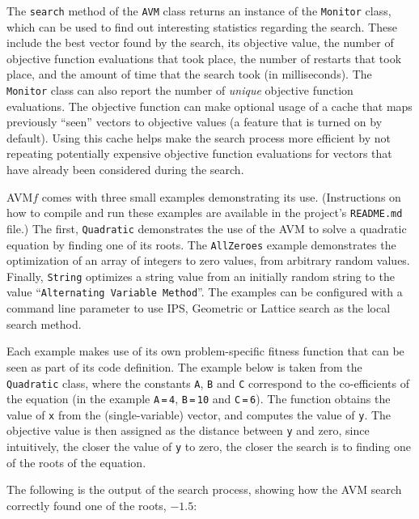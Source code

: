 \documentclass{llncs}
\newcommand{\AVM}{Alternating Variable Method\xspace}
\newcommand{\name}{AVM\hspace{-1pt}$f$\xspace}
\newcommand{\inlineheading}[1]{\vspace{1ex} \noindent {\bf #1.}}
\newcommand{\codescalefactor}{0.7}
\newcommand{\snippet}[1]{
	\begin{center}
		\scalebox{\codescalefactor}{
			\begin{tabular}{|l|}
			\hline
			
			\hline
			\end{tabular}
		}
	\end{center}
}
\begin{document}
\begin{sloppypar}
\inlineheading{Reporting} The {\tt search} method of the {\tt AVM} class returns an instance of the {\tt Monitor} class, which can be used to find out interesting statistics regarding the search. These include the best vector found by the search, its objective value, the number of objective function evaluations that took place, the number of restarts that took place, and the amount of time that the search took (in milliseconds). The {\tt Monitor} class can also report the number of {\it unique} objective function evaluations. The objective function can make optional usage of a cache that maps previously ``seen'' vectors to objective values (a feature that is turned on by default). Using this cache helps make the search process more efficient by not repeating potentially expensive objective function evaluations for vectors that have already been considered during the search.
\end{sloppypar}

\inlineheading{Examples} \name comes with three small examples demonstrating its use. (Instructions on how to compile and run these examples are available in the project's {\tt README.md} file.) The first, {\tt Quadratic} demonstrates the use of the AVM to solve a quadratic equation by finding one of its roots. The {\tt AllZeroes} example demonstrates the optimization of an array of integers to zero values, from arbitrary random values. Finally, {\tt String} optimizes a string value from an initially random string to the value ``{\tt \AVM}''. The examples can be configured with a command line parameter to use IPS, Geometric or Lattice search as the local search method.

Each example makes use of its own problem-specific fitness function that can be seen as part of its code definition. The example below is taken from the {\tt Quadratic} class, where the constants {\tt A}, {\tt B} and {\tt C} correspond to the co-efficients of the equation (in the example {\tt A}\,{\tt =}\,{\tt 4}, {\tt B}\,{\tt =}\,{\tt 10} and {\tt C}\,{\tt =}\,{\tt 6}). The function obtains the value of {\tt x} from the (single-variable) vector, and computes the value of {\tt y}. The objective value is then assigned as the distance between {\tt y} and zero, since intuitively, the closer the value of {\tt y} to zero, the closer the search is to finding one of the roots of the equation.

\snippet{objective-fn}

The following is the output of the search process, showing how the AVM search correctly found one of the roots, $-1.5$:
\end{document}

